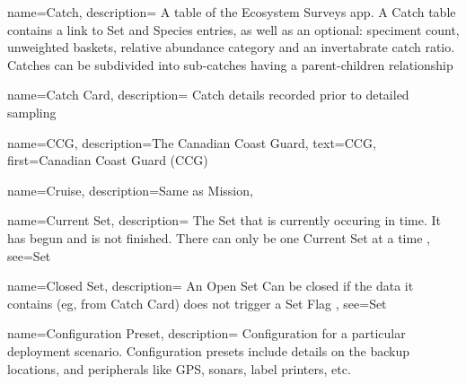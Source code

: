  {
    name=Catch,
    description={
        A table of the Ecosystem Surveys app. A Catch table contains a link to \gls{Set} and \gls{Species} entries, as well as an optional: speciment count, unweighted baskets, relative abundance category and an invertabrate catch ratio. Catches can be subdivided into sub-catches having a parent-children relationship}
}

 {
    name=Catch Card,
    description={
        Catch details recorded prior to detailed sampling}
}

 {
    name=CCG,
    description={The Canadian Coast Guard},
    text={CCG},
    first={Canadian Coast Guard (CCG)}
}

 {
    name=Cruise,
    description={Same as \gls{Mission}},
}

 {
    name=Current Set,
    description={
        The \gls{Set} that is currently occuring in time.
        It has begun and is not finished.
        There can only be one \gls{Current Set} at a time
    },
    see={Set}
}

 {
    name=Closed Set,
    description={
        An \gls{Open Set} Can be closed if the data it contains (eg, from \gls{Catch Card}) does not trigger a \gls{Set Flag}
    },
    see={Set}
}

 {
    name=Configuration Preset,
    description={
        Configuration for a particular deployment scenario. Configuration presets include details on the backup locations, and peripherals like GPS, sonars, label printers, etc.
    }
}





